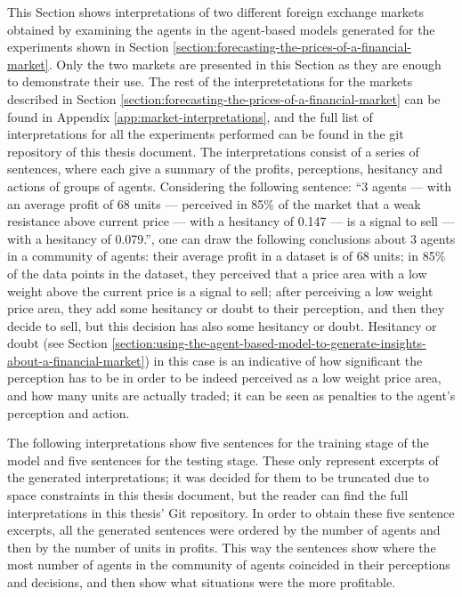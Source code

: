 This Section shows interpretations of two different foreign exchange markets
obtained by examining the agents in the agent-based models generated for the
experiments shown in Section
\ref{section:forecasting-the-prices-of-a-financial-market}. Only the two markets
are presented in this Section as they are enough to demonstrate their use. The
rest of the interpretetations for the markets described in Section
\ref{section:forecasting-the-prices-of-a-financial-market} can be found in
Appendix \ref{app:market-interpretations}, and the full list of interpretations
for all the experiments performed can be found in the git repository of this
thesis document. The interpretations
consist of a series of sentences, where each give a summary of the profits,
perceptions, hesitancy and actions of groups of agents. Considering the
following sentence: ``3 agents — with an average profit of 68 units — perceived
in 85\% of the market that a weak resistance above current price — with a
hesitancy of 0.147 — is a signal to sell — with a hesitancy of 0.079.'', one can
draw the following conclusions about 3 agents in a community of agents: their
average profit in a dataset is of 68 units; in 85\% of the data points in the
dataset, they perceived that a price area with a low weight above the current
price is a signal to sell; after perceiving a low weight price area, they add
some hesitancy or doubt to their perception, and then they decide to sell, but
this decision has also some hesitancy or doubt. Hesitancy or doubt (see Section
\ref{section:using-the-agent-based-model-to-generate-insights-about-a-financial-market})
in this case is an indicative of how significant the perception has to be in
order to be indeed perceived as a low weight price area, and how many units are
actually traded; it can be seen as penalties to the agent's perception and
action.

The following interpretations show five sentences for the training stage of the
model and five sentences for the testing stage. These only represent excerpts of
the generated interpretations; it was decided for them to be truncated due to
space constraints in this thesis document, but the reader can find the full
interpretations in this thesis' Git repository. In order to obtain these five
sentence excerpts, all the generated sentences were ordered by the number of
agents and then by the number of units in profits. This way the sentences show
where the most number of agents in the community of agents coincided in their
perceptions and decisions, and then show what situations were the more
profitable.

